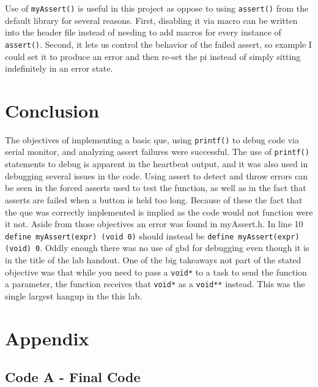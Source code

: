 \documentclass[sigconf]{article}
\begin{document}
Use of \lstinline{myAssert()} is useful in this project as oppose to using \lstinline{assert()} from the default library for several reasons. First, disabling it via macro can be written into the header file instead of needing to add macros for every instance of \lstinline{assert()}. Second, it lets us control the behavior of the failed assert, so example I could set it to produce an error and then re-set the pi instead of simply sitting indefinitely in an error state.


\section*{Conclusion}

The objectives of implementing a basic que, using \lstinline{printf()} to debug code via serial monitor, and analyzing assert failures were successful. The use of \lstinline{printf()} statements to debug is apparent in the heartbeat output, and it was also used in debugging several issues in the code. Using assert to detect and throw errors can be seen in the forced asserts used to test the function, as well as in the fact that asserts are failed when a button is held too long. Because of these the fact that the que was correctly implemented is implied as the code would not function were it not. Aside from those objectives an error was found in myAssert.h. In line 10 \lstinline{define myAssert(expr) (void 0)} should instead be \lstinline{define myAssert(expr)    (void) 0}. Oddly enough there was no use of gbd for debugging even though it is in the title of the lab handout. One of the big takeaways not part of the stated objective was that while you need to pass a \lstinline{void*} to a task to send the function a parameter, the function receives that \lstinline{void*} as a \lstinline{void**} instead. This was the single largest hangup in the this lab.


\clearpage
\section*{Appendix}
\subsection*{Code A - Final Code}
\end{document}
